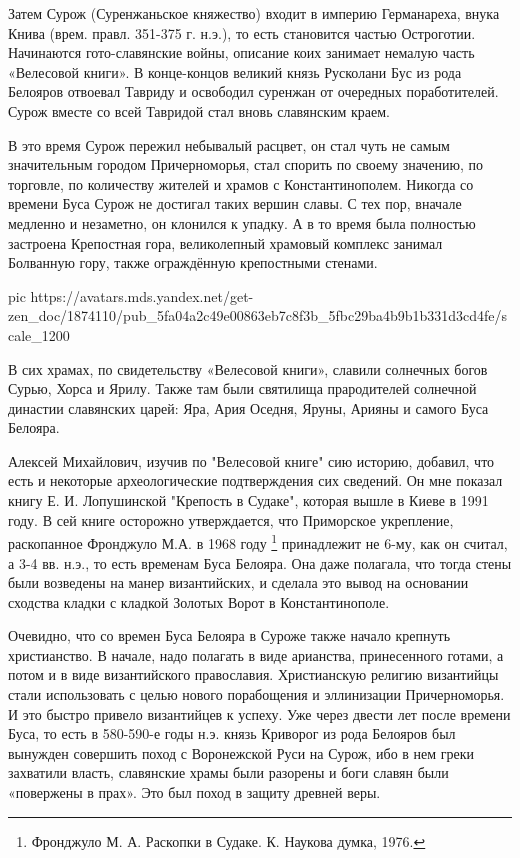 Затем Сурож (Суренжаньское княжество) входит в империю Гер­манареха, внука
Книва (врем. правл. 351-375 г. н.э.), то есть становится частью Остроготии.
Начинаются гото-сла­вянские войны, описание коих занимает немалую часть
«Велесовой книги». В конце-концов великий князь Русколани Бус из рода Белояров
отвоевал Тавриду и освободил суренжан от очередных поработителей. Сурож вместе
со всей Тавридой стал вновь славянским краем.

В это время Сурож пережил небывалый расцвет, он стал чуть не самым значительным
городом Причерноморья, стал спорить по своему значению, по торговле, по
количеству жителей и храмов с Константинополем. Никогда со времени Буса Сурож
не достигал таких вершин славы. С тех пор, вначале медленно и незаметно, он
клонился к упадку. А в то время была полностью застроена Крепостная гора,
великолепный храмовый комплекс занимал Болванную гору, также ограждённую
крепостными стенами. 

\ifcmt
  pic https://avatars.mds.yandex.net/get-zen_doc/1874110/pub_5fa04a2c49e00863eb7c8f3b_5fbc29ba4b9b1b331d3cd4fe/scale_1200
\fi

В сих храмах, по свидетельству «Велесовой книги», славили сол­нечных богов
Сурью, Хорса и Ярилу. Также там были святилища пра­родителей солнечной династии
славянских царей: Яра, Ария Оседня, Яруны, Арияны и самого Буса Белояра.

Алексей Михайлович, изучив по "Велесовой книге" сию историю, добавил, что есть
и некоторые археологические подтверждения сих сведений. Он мне показал книгу Е.
И. Лопушинской "Крепость в Судаке", которая вышле в Киеве в 1991 году. В сей
книге осторожно утверждается, что Приморское укрепление, раскопанное Фронджуло
М.А. в 1968 году \footnote{Фронджуло М. А. Раскопки в Судаке. К. Наукова думка,
1976.} принадлежит не 6-му, как он считал, а 3-4 вв. н.э., то есть временам
Буса Белояра. Она даже полагала, что тогда стены были возведены на манер
византийских, и сделала это вывод на основании сходства кладки с кладкой
Золотых Ворот в Константинополе.

Очевидно, что со времен Буса Белояра в Суроже также начало крепнуть
христианство. В начале, надо полагать в виде арианства, принесенного готами, а
потом и в виде византийского православия. Хри­стианскую религию византийцы
стали использовать с целью нового порабощения и эллинизации Причерноморья. И
это быстро привело византийцев к успеху. Уже через двести лет после времени
Буса, то есть в 580-590-е годы н.э. князь Криворог из рода Белояров был
вынужден совершить поход с Воронежской Руси на Сурож, ибо в нем греки захватили
власть, славянские храмы были разорены и боги славян были «повержены в прах».
Это был поход в защиту древней веры.

